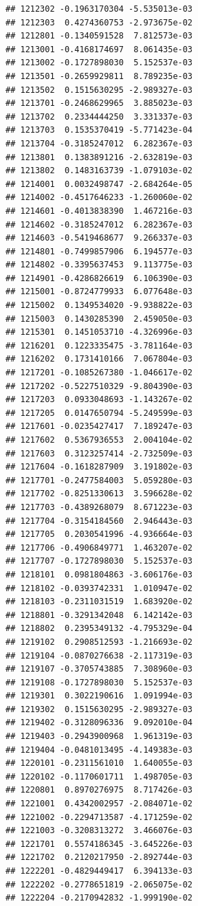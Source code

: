 \documentclass[ignorenonframetext,]{beamer}
\begin{document}
\begin{frame}[fragile]
\begin{verbatim}
## 1212302 -0.1963170304 -5.535013e-03
## 1212303  0.4274360753 -2.973675e-02
## 1212801 -0.1340591528  7.812573e-03
## 1213001 -0.4168174697  8.061435e-03
## 1213002 -0.1727898030  5.152537e-03
## 1213501 -0.2659929811  8.789235e-03
## 1213502  0.1515630295 -2.989327e-03
## 1213701 -0.2468629965  3.885023e-03
## 1213702  0.2334444250  3.331337e-03
## 1213703  0.1535370419 -5.771423e-04
## 1213704 -0.3185247012  6.282367e-03
## 1213801  0.1383891216 -2.632819e-03
## 1213802  0.1483163739 -1.079103e-02
## 1214001  0.0032498747 -2.684264e-05
## 1214002 -0.4517646233 -1.260060e-02
## 1214601 -0.4013838390  1.467216e-03
## 1214602 -0.3185247012  6.282367e-03
## 1214603 -0.5419468677  9.266337e-03
## 1214801 -0.7499857906  6.194577e-03
## 1214802 -0.3395637453  9.113775e-03
## 1214901 -0.4286826619  6.106390e-03
## 1215001 -0.8724779933  6.077648e-03
## 1215002  0.1349534020 -9.938822e-03
## 1215003  0.1430285390  2.459050e-03
## 1215301  0.1451053710 -4.326996e-03
## 1216201  0.1223335475 -3.781164e-03
## 1216202  0.1731410166  7.067804e-03
## 1217201 -0.1085267380 -1.046617e-02
## 1217202 -0.5227510329 -9.804390e-03
## 1217203  0.0933048693 -1.143267e-02
## 1217205  0.0147650794 -5.249599e-03
## 1217601 -0.0235427417  7.189247e-03
## 1217602  0.5367936553  2.004104e-02
## 1217603  0.3123257414 -2.732509e-03
## 1217604 -0.1618287909  3.191802e-03
## 1217701 -0.2477584003  5.059280e-03
## 1217702 -0.8251330613  3.596628e-02
## 1217703 -0.4389268079  8.671223e-03
## 1217704 -0.3154184560  2.946443e-03
## 1217705  0.2030541996 -4.936664e-03
## 1217706 -0.4906849771  1.463207e-02
## 1217707 -0.1727898030  5.152537e-03
## 1218101  0.0981804863 -3.606176e-03
## 1218102 -0.0393742331  1.010947e-02
## 1218103 -0.2311031519  1.683920e-02
## 1218801 -0.3291342048  6.142142e-03
## 1218802  0.2395349132 -4.795329e-04
## 1219102  0.2908512593 -1.216693e-02
## 1219104 -0.0870276638 -2.117319e-03
## 1219107 -0.3705743885  7.308960e-03
## 1219108 -0.1727898030  5.152537e-03
## 1219301  0.3022190616  1.091994e-03
## 1219302  0.1515630295 -2.989327e-03
## 1219402 -0.3128096336  9.092010e-04
## 1219403 -0.2943900968  1.961319e-03
## 1219404 -0.0481013495 -4.149383e-03
## 1220101 -0.2311561010  1.640055e-03
## 1220102 -0.1170601711  1.498705e-03
## 1220801  0.8970276975  8.717426e-03
## 1221001  0.4342002957 -2.084071e-02
## 1221002 -0.2294713587 -4.171259e-02
## 1221003 -0.3208313272  3.466076e-03
## 1221701  0.5574186345 -3.645226e-03
## 1221702  0.2120217950 -2.892744e-03
## 1222201 -0.4829449417  6.394133e-03
## 1222202 -0.2778651819 -2.065075e-02
## 1222204 -0.2170942832 -1.999190e-02

\end{verbatim}
\end{frame}
\end{document}
